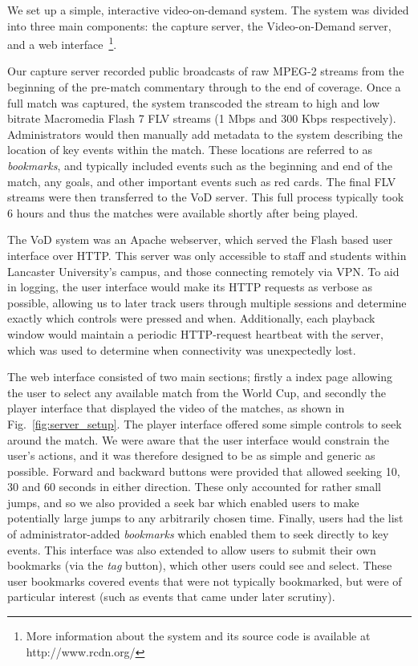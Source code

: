 \documentclass[letterpaper,nocopyrightspace]{sig-alternate}
\begin{document}
We set up a simple, interactive video-on-demand
system. The system was divided
into three main components: the capture server, the Video-on-Demand
server, and a web interface~\footnote{More information about the system and its source
code is available at http://www.rcdn.org/}.


Our capture server recorded public broadcasts of raw MPEG-2 streams
from the beginning of the pre-match commentary through to the end of
coverage. Once a full match was captured, the system transcoded the
stream to high and low bitrate Macromedia Flash 7 FLV streams (1
Mbps and 300 Kbps respectively). Administrators would then manually
add metadata to the system describing the location of key events
within the match. These locations are referred to as
\emph{bookmarks}, and typically included events such as the
beginning and end of the match, any goals, and other important
events such as red cards. The final FLV streams were then
transferred to the VoD server. This full process typically took 6
hours and thus the matches were available shortly after being
played.

The VoD system was an Apache webserver, which served the Flash based
user interface over HTTP. This server was only accessible to staff
and students within Lancaster University's campus, and those
connecting remotely via VPN. To aid in logging, the user interface
would make its HTTP requests as verbose as possible, allowing us to
later track users through multiple sessions and determine exactly
which controls were pressed and when. Additionally, each playback
window would maintain a periodic HTTP-request heartbeat with the
server, which was used to determine when connectivity was
unexpectedly lost.

The web interface consisted of two main sections; firstly a index
page allowing the user to select any available match from the World
Cup, and secondly the player interface that displayed the video of
the matches, as shown in Fig.~\ref{fig:server_setup}. The player
interface offered some simple controls to seek around the match. We
were aware that the user interface would constrain the user's
actions, and it was therefore designed to be as simple and generic
as possible. Forward and backward buttons were provided that allowed
seeking 10, 30 and 60 seconds in either direction. These only
accounted for rather small jumps, and so we also provided a seek bar
which enabled users to make potentially large jumps to any
arbitrarily chosen time. Finally, users had the list of
administrator-added \emph{bookmarks} which enabled them to seek
directly to key events. This interface was also extended to allow
users to submit their own bookmarks (via the \emph{tag} button),
which other users could see and select. These user bookmarks covered
events that were not typically bookmarked, but were of particular
interest (such as events that came under later scrutiny).
\end{document}
